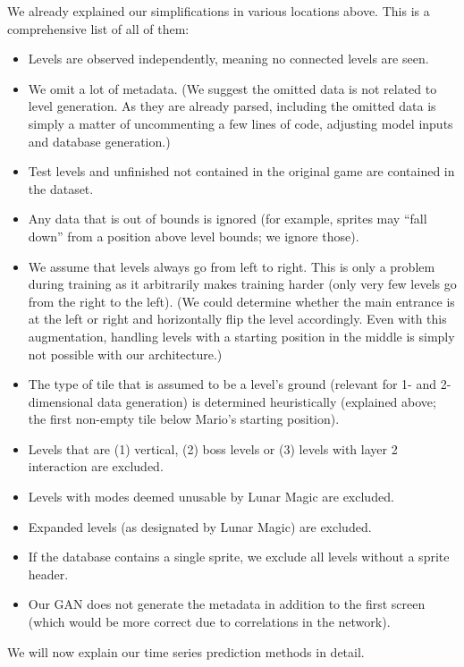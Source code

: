 We already explained our simplifications in various locations above.
This is a comprehensive list of all of them:
\begin{itemize}
\item Levels are observed independently, meaning no connected levels
  are seen.
\item We omit a lot of metadata. (We suggest the omitted data is not
  related to level generation. As they are already parsed, including
  the omitted data is simply a matter of uncommenting a few lines of
  code, adjusting model inputs and database generation.)
\item Test levels and unfinished not contained in the original game
  are contained in the dataset.
\item Any data that is out of bounds is ignored (for example, sprites
  may ``fall down'' from a position above level bounds; we ignore
  those).
\item We assume that levels always go from left to right. This is only
  a problem during training as it arbitrarily makes training harder
  (only very few levels go from the right to the left). (We could
  determine whether the main entrance is at the left or right and
  horizontally flip the level accordingly. Even with this
  augmentation, handling levels with a starting position in the middle
  is simply not possible with our architecture.)
\item The type of tile that is assumed to be a level's ground
  (relevant for 1- and 2-dimensional data generation) is determined
  heuristically (explained above; the first non-empty tile below
  Mario's starting position).
\item Levels that are (1) vertical, (2) boss levels or (3)
  levels with layer 2 interaction are excluded.
\item Levels with modes deemed unusable by Lunar Magic are excluded.
\item Expanded levels (as designated by Lunar Magic) are excluded.
\item If the database contains a single sprite, we exclude all levels
  without a sprite header.
\item Our GAN does not generate the metadata in addition to the first
  screen (which would be more correct due to correlations in the
  network).
\end{itemize}

We will now explain our time series prediction methods in detail.


